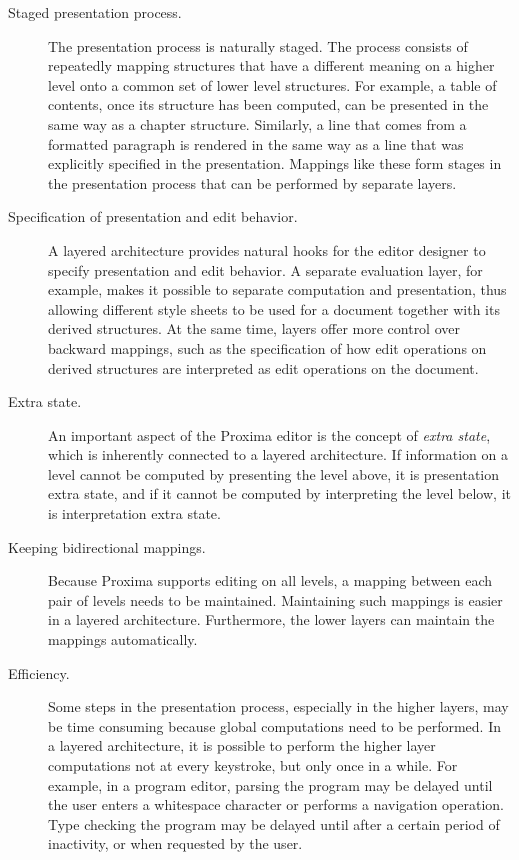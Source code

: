\begin{description}

\item[Staged presentation process.]
The presentation process is naturally staged. The process consists of repeatedly mapping  structures that have a different meaning on a higher level onto a common set of lower level structures. For example, a table of contents, once its structure has been computed, can be presented in the same way as a chapter structure. Similarly, a line that comes from a formatted paragraph is rendered in the same way as a line that was explicitly specified in the presentation. Mappings like these form stages in the presentation process that can be performed by separate layers.

\item[Specification of presentation and edit behavior.]
A layered architecture provides natural hooks for the editor designer to specify presentation and edit behavior. A separate evaluation layer, for example, makes it possible to separate computation and presentation, thus allowing different style sheets to be used for a document together with its derived structures. At the same time, layers offer more control over backward mappings, such as the specification of how edit operations on derived structures are interpreted as edit operations on the document.

\item[Extra state.]
An important aspect of the Proxima editor is the concept of {\em extra state}, which is inherently connected to a layered architecture. If information on a level cannot be computed by presenting the level above, it is presentation extra state, and if it cannot be computed by interpreting the level below, it is interpretation extra state.

\item[Keeping bidirectional mappings.]
Because Proxima supports editing on all levels, a mapping between each pair of levels needs to be maintained. Maintaining such mappings is easier in a layered architecture. Furthermore, the lower layers can maintain the mappings automatically.

\item[Efficiency.]
Some steps in the presentation process, especially in the higher layers, may be time consuming because global computations need to be performed. In a layered architecture, it is possible to perform the higher layer computations not at every keystroke, but only once in a while. For example, in a program editor, parsing the program may be delayed until the user enters a whitespace character or performs a navigation operation. Type checking the program may be delayed until after a certain period of inactivity, or when requested by the user.
\end{description}

